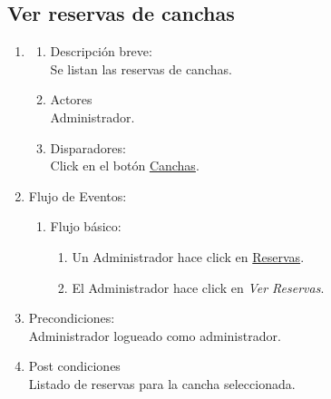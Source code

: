 \documentclass[a4paper,11pt]{article}
\begin{document}
\subsection{Ver reservas de canchas}
\begin{enumerate}

    \item
    \begin{enumerate}
    \item Descripción breve: \\
        Se listan las reservas de canchas.
    \item Actores \\
        Administrador.
    \item Disparadores: \\
        Click en el botón \underline{Canchas}.
    \end{enumerate}

    \item Flujo de Eventos:

    \begin{enumerate}

        \item Flujo básico:
		\begin{enumerate}
            	\item	Un Administrador hace click en \underline{Reservas}.
		\item	El Administrador hace click en \emph{Ver Reservas}.
		\end{enumerate}
    \end{enumerate}

    \item Precondiciones: \\
        Administrador logueado como administrador.

    \item Post condiciones \\
        Listado de reservas para la cancha seleccionada.

\end{enumerate}

\end{document}
